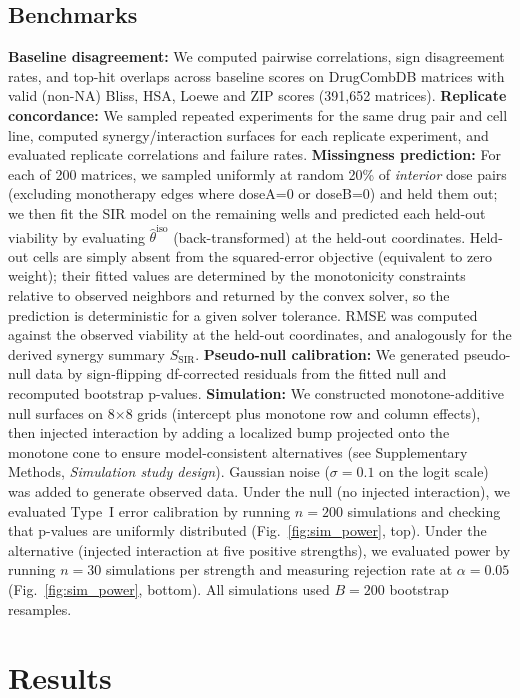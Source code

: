 \documentclass[unnumsec,webpdf,contemporary,large]{oup-authoring-template}
\begin{document}
\subsection{Benchmarks}
\textbf{Baseline disagreement:} We computed pairwise correlations, sign disagreement rates, and top-hit overlaps across baseline scores on DrugCombDB matrices with valid (non-NA) Bliss, HSA, Loewe and ZIP scores (391{,}652 matrices).
\textbf{Replicate concordance:} We sampled repeated experiments for the same drug pair and cell line, computed synergy/interaction surfaces for each replicate experiment, and evaluated replicate correlations and failure rates.
\textbf{Missingness prediction:} For each of 200 matrices, we sampled uniformly at random 20\% of \emph{interior} dose pairs (excluding monotherapy edges where doseA=0 or doseB=0) and held them out; we then fit the SIR model on the remaining wells and predicted each held-out viability by evaluating $\hat\theta^{\mathrm{iso}}$ (back-transformed) at the held-out coordinates. Held-out cells are simply absent from the squared-error objective (equivalent to zero weight); their fitted values are determined by the monotonicity constraints relative to observed neighbors and returned by the convex solver, so the prediction is deterministic for a given solver tolerance. RMSE was computed against the observed viability at the held-out coordinates, and analogously for the derived synergy summary $S_{\mathrm{SIR}}$.
\textbf{Pseudo-null calibration:} We generated pseudo-null data by sign-flipping df-corrected residuals from the fitted null and recomputed bootstrap p-values.
\textbf{Simulation:} We constructed monotone-additive null surfaces on 8$\times$8 grids (intercept plus monotone row and column effects), then injected interaction by adding a localized bump projected onto the monotone cone to ensure model-consistent alternatives (see Supplementary Methods, \emph{Simulation study design}).
Gaussian noise ($\sigma=0.1$ on the logit scale) was added to generate observed data.
Under the null (no injected interaction), we evaluated Type~I error calibration by running $n=200$ simulations and checking that p-values are uniformly distributed (Fig.~\ref{fig:sim_power}, top).
Under the alternative (injected interaction at five positive strengths), we evaluated power by running $n=30$ simulations per strength and measuring rejection rate at $\alpha=0.05$ (Fig.~\ref{fig:sim_power}, bottom).
All simulations used $B=200$ bootstrap resamples.

\section{Results}
\end{document}
